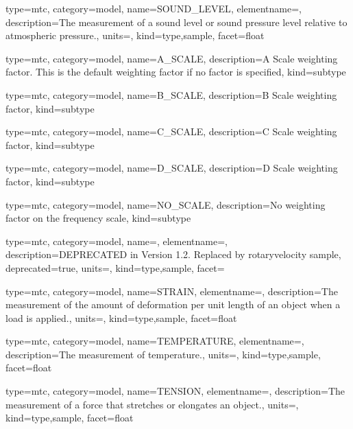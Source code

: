 {
  type=mtc,
  category=model,
  name={SOUND\_LEVEL},
  elementname=,
  description={The measurement of a sound level or sound pressure level relative to atmospheric pressure.},
  units=,
  kind={type,sample},
  facet={\gls{float}}
}


{
  type=mtc,
  category=model,
  name={A\_SCALE},
  description={A Scale weighting factor.   This is the default weighting factor if no factor is specified},
  kind={subtype}
}


{
  type=mtc,
  category=model,
  name={B\_SCALE},
  description={B Scale weighting factor},
  kind={subtype}
}


{
  type=mtc,
  category=model,
  name={C\_SCALE},
  description={C Scale weighting factor},
  kind={subtype}
}


{
  type=mtc,
  category=model,
  name={D\_SCALE},
  description={D Scale weighting factor},
  kind={subtype}
}


{
  type=mtc,
  category=model,
  name={NO\_SCALE},
  description={No weighting factor on the frequency scale},
  kind={subtype}
}


{
  type=mtc,
  category=model,
  name={},
  elementname=,
  description={DEPRECATED in Version 1.2.  Replaced by \gls{rotaryvelocity sample}},
  deprecated={true},
  units={},
  kind={type,sample},
  facet={}
}



{
  type=mtc,
  category=model,
  name={STRAIN},
  elementname=,
  description={The measurement of the amount of deformation per unit length of an object when a load is applied.},
  units=,
  kind={type,sample},
  facet={\gls{float}}
}


{
  type=mtc,
  category=model,
  name={TEMPERATURE},
  elementname=,
  description={The measurement of temperature.},
  units=,
  kind={type,sample},
  facet={\gls{float}}
}


{
  type=mtc,
  category=model,
  name={TENSION},
  elementname=,
  description={The measurement of a force that stretches or elongates an object.},
  units=,
  kind={type,sample},
  facet={\gls{float}}
}


